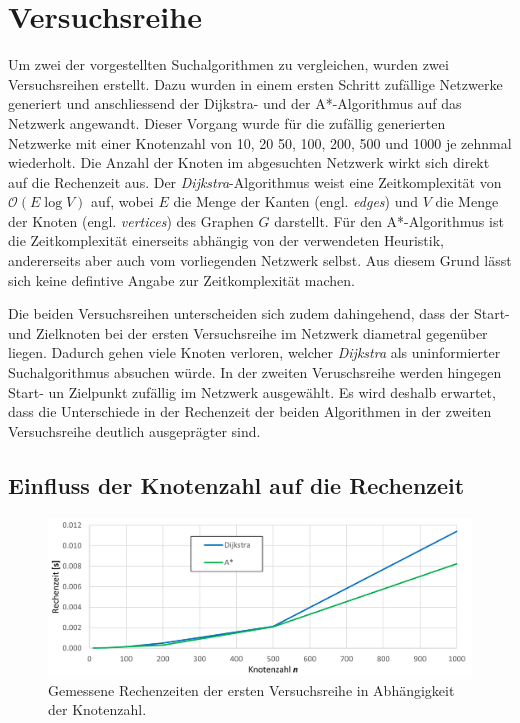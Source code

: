\section{Versuchsreihe}
\label{section:verkehr/versuchsreihe}

Um zwei der vorgestellten Suchalgorithmen zu vergleichen, wurden zwei Versuchsreihen erstellt. Dazu wurden in einem ersten Schritt zufällige Netzwerke generiert und anschliessend der Dijkstra- und der A*-Algorithmus auf das Netzwerk angewandt.
Dieser Vorgang wurde für die zufällig generierten Netzwerke mit einer Knotenzahl von 10, 20 50, 100, 200, 500 und 1000 je zehnmal wiederholt.
Die Anzahl der Knoten im abgesuchten Netzwerk wirkt sich direkt auf die Rechenzeit aus. Der \emph{Dijkstra}-Algorithmus weist eine Zeitkomplexität von $\mathcal{O}(E\log{}V)$ auf, wobei $E$ die Menge der Kanten (engl. \emph{edges}) und $V$ die Menge der Knoten (engl. \emph{vertices}) des Graphen $G$ darstellt.
Für den A*-Algorithmus ist die Zeitkomplexität einerseits abhängig von der verwendeten Heuristik, andererseits aber auch vom vorliegenden Netzwerk selbst. Aus diesem Grund lässt sich keine defintive Angabe zur Zeitkomplexität machen.

Die beiden Versuchsreihen unterscheiden sich zudem dahingehend, dass der Start- und Zielknoten bei der ersten Versuchsreihe im Netzwerk diametral gegenüber liegen. Dadurch gehen viele Knoten verloren, welcher \emph{Dijkstra} als uninformierter Suchalgorithmus absuchen würde. In der zweiten Veruschsreihe werden hingegen Start- un Zielpunkt zufällig im Netzwerk ausgewählt. Es wird deshalb erwartet, dass die Unterschiede in der Rechenzeit der beiden Algorithmen in der zweiten Versuchsreihe deutlich ausgeprägter sind.

\subsection{Einfluss der Knotenzahl auf die Rechenzeit}
\label{verkehr:Knotenzahl}

\begin{figure}
\centering
\includegraphics[width=12cm]{papers/verkehr/figures/chart_Vr1.png}

\caption{Gemessene Rechenzeiten der ersten Versuchsreihe in Abhängigkeit der Knotenzahl.}
\label{verkehr:Vr1}
\end{figure}

